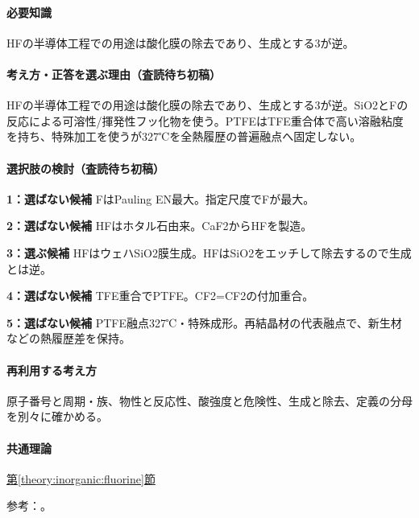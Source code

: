 \paragraph{必要知識} HFの半導体工程での用途は酸化膜の除去であり、生成とする3が逆。

\paragraph{考え方・正答を選ぶ理由（査読待ち初稿）} HFの半導体工程での用途は酸化膜の除去であり、生成とする3が逆。SiO2とFの反応による可溶性/揮発性フッ化物を使う。PTFEはTFE重合体で高い溶融粘度を持ち、特殊加工を使うが327℃を全熱履歴の普遍融点へ固定しない。

\paragraph{選択肢の検討（査読待ち初稿）}\mbox{}\par

\noindent\textbf{1：選ばない候補} FはPauling EN最大。指定尺度でFが最大。\par

\noindent\textbf{2：選ばない候補} HFはホタル石由来。CaF2からHFを製造。\par

\noindent\textbf{3：選ぶ候補} HFはウェハSiO2膜生成。HFはSiO2をエッチして除去するので生成とは逆。\par

\noindent\textbf{4：選ばない候補} TFE重合でPTFE。CF2=\allowbreak{}CF2の付加重合。\par

\noindent\textbf{5：選ばない候補} PTFE融点327℃・特殊成形。再結晶材の代表融点で、新生材などの熱履歴差を保持。\par

\paragraph{再利用する考え方} 原子番号と周期・族、物性と反応性、酸強度と危険性、生成と除去、定義の分母を別々に確かめる。

\paragraph{共通理論} \hyperref[theory:inorganic:fluorine]{第\ref*{theory:inorganic:fluorine}節}

\par 参考：\cite{inorganic_metalloid_ref,inorganic_hf_etch,inorganic_ptfe}。

